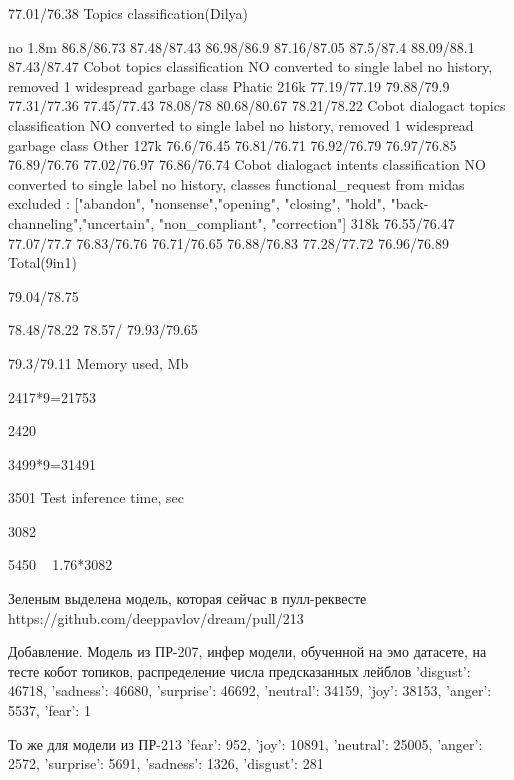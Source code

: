 77.01/76.38
Topics classification(Dilya)


no
1.8m
86.8/86.73
87.48/87.43
86.98/86.9
87.16/87.05
87.5/87.4
88.09/88.1
87.43/87.47
Cobot topics classification
NO
converted to single label no history, removed 1 widespread garbage class Phatic
216k
77.19/77.19
79.88/79.9
77.31/77.36
77.45/77.43
78.08/78
80.68/80.67
78.21/78.22
Cobot dialogact topics classification
NO
converted to single label no history, removed 1 widespread garbage class Other
127k
76.6/76.45
76.81/76.71
76.92/76.79
76.97/76.85
76.89/76.76
77.02/76.97
76.86/76.74
Cobot dialogact intents classification
NO
converted to single label no history, classes functional_request from midas excluded
    : ["abandon", "nonsense","opening", "closing", "hold", "back-channeling","uncertain", "non_compliant", "correction"]
318k
76.55/76.47
77.07/77.7
76.83/76.76
76.71/76.65
76.88/76.83
77.28/77.72
76.96/76.89
Total(9in1)






79.04/78.75


78.48/78.22
78.57/
79.93/79.65


79.3/79.11
Memory used, Mb






2417*9=21753


2420


3499*9=31491


3501
Test inference time, sec










3082






5450  ~ 1.76*3082

Зеленым выделена модель, которая сейчас в пулл-реквесте https://github.com/deeppavlov/dream/pull/213


Добавление. Модель из ПР-207, инфер модели, обученной на эмо датасете, на тесте кобот топиков, распределение числа предсказанных лейблов
{'disgust': 46718, 'sadness': 46680, 'surprise': 46692, 'neutral': 34159, 'joy': 38153, 'anger': 5537, 'fear': 1}



То же для модели из ПР-213
{'fear': 952, 'joy': 10891, 'neutral': 25005, 'anger': 2572, 'surprise': 5691, 'sadness': 1326, 'disgust': 281}









